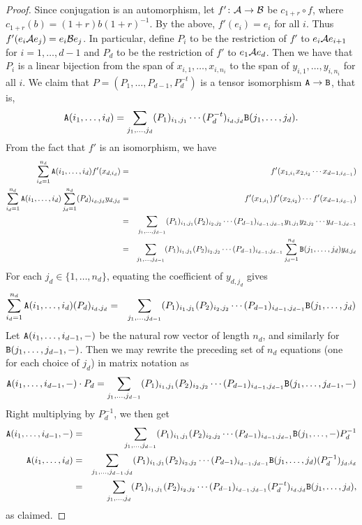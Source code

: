 \documentclass[11pt]{article}
\begin{document}
\begin{proof}
Since conjugation is an automorphism, let $f'\colon \mathcal{A} \to \mathcal{B}$ be $c_{1+r} \circ f$, where $c_{1+r}(b) = (1+r)b(1+r)^{-1}$. By the above, $f'(e_i) = e_i$ for all $i$. 
Thus $f'(e_i \mathcal{A} e_j) = e_i \mathcal{B} e_j$. In particular, define $P_i$ to be the restriction of $f'$ to $e_i \mathcal{A} e_{i+1}$ for $i=1,\dotsc,d-1$ and $P_d$ to be the restriction of $f'$ to $e_1 \mathcal{A} e_d$. Then we have that $P_i$ is a linear bijection from the span of $x_{i,1},\dotsc,x_{i,n_i}$ to the span of $y_{i,1},\dotsc,y_{i,n_i}$ for all $i$. We claim that $P = (P_1,\dotsc,P_{d-1},P_d^{-t})$ is a tensor isomorphism $\mathtt{A} \to \mathtt{B}$, that is, 
\[
\mathtt{A}(i_1, \dotsc, i_d) = \sum_{j_1, \dotsc, j_d} (P_1)_{i_1,j_1} \dotsb (P_d^{-t})_{i_d,j_d} \mathtt{B}(j_1, \dotsc, j_d).
\]
From the fact that $f'$ is an isomorphism, we have
\begin{eqnarray*}
\sum_{i_d=1}^{n_d} \mathtt{A}(i_1, \dotsc, i_d) f'(x_{d,i_d}) & = & f'(x_{1,i_1} x_{2,i_2} \dotsb x_{d-1,i_{d-1}}) \\
\sum_{i_d=1}^{n_d} \mathtt{A}(i_1, \dotsc, i_d) \sum_{j_d=1}^{n_d} (P_d)_{i_d,j_d} y_{d,j_d} & = & f'(x_{1,i_1}) f'(x_{2,i_2}) \dotsb f'(x_{d-1,i_{d-1}}) \\
 & = & \sum_{j_1,\dotsc,j_{d-1}} (P_1)_{i_1,j_1} (P_2)_{i_2,j_2} \dotsb (P_{d-1})_{i_{d-1}, j_{d-1}} y_{1,j_1} y_{2,j_2} \dotsb y_{d-1,j_{d-1}} \\
 & = & \sum_{j_1, \dotsc, j_{d-1}} (P_1)_{i_1,j_1} (P_2)_{i_2,j_2} \dotsb (P_{d-1})_{i_{d-1}, j_{d-1}} \sum_{j_d=1}^{n_d} \mathtt{B}(j_1,\dotsc,j_d) y_{d,j_d}
\end{eqnarray*}
For each $j_d \in \{1,\dotsc,n_d\}$, equating the coefficient of $y_{d,j_d}$ gives
\begin{eqnarray*}
\sum_{i_d=1}^{n_d} \mathtt{A}(i_1, \dotsc, i_d)  (P_d)_{i_d,j_d} & = & \sum_{j_1, \dotsc, j_{d-1}} (P_1)_{i_1,j_1} (P_2)_{i_2,j_2} \dotsb (P_{d-1})_{i_{d-1}, j_{d-1}} \mathtt{B}(j_1,\dotsc,j_d)
\end{eqnarray*}
Let $\mathtt{A}(i_1, \dotsc, i_{d-1}, -)$ be the natural row vector of length $n_d$, and similarly for $\mathtt{B}(j_1, \dotsc, j_{d-1}, -)$. Then we may rewrite the preceding set of $n_d$ equations (one for each choice of $j_d$) in matrix notation as
\[
\mathtt{A}(i_1, \dotsc, i_{d-1}, -) \cdot P_d = \sum_{j_1, \dotsc, j_{d-1}} (P_1)_{i_1,j_1} (P_2)_{i_2,j_2} \dotsb (P_{d-1})_{i_{d-1}, j_{d-1}} \mathtt{B}(j_1,\dotsc, j_{d-1},-)
\]
Right multiplying by $P_d^{-1}$, we then get
\begin{eqnarray*}
\mathtt{A}(i_1, \dotsc, i_{d-1},-) & = & \sum_{j_1, \dotsc, j_{d-1}} (P_1)_{i_1,j_1} (P_2)_{i_2,j_2} \dotsb (P_{d-1})_{i_{d-1}, j_{d-1}} \mathtt{B}(j_1,\dotsc, -) P_d^{-1} \\
\mathtt{A}(i_1,\dotsc,i_d) & = & \sum_{j_1, \dotsc, j_{d-1},j_d} (P_1)_{i_1,j_1} (P_2)_{i_2,j_2} \dotsb (P_{d-1})_{i_{d-1}, j_{d-1}} \mathtt{B}(j_1,\dotsc, j_d) (P_d^{-1})_{j_d,i_d} \\
& = & \sum_{j_1,\dotsc,j_d} (P_1)_{i_1,j_1} (P_2)_{i_2,j_2} \dotsb (P_{d-1})_{i_{d-1}, j_{d-1}} (P_d^{-t})_{i_d,j_d} \mathtt{B}(j_1,\dotsc, j_d),
\end{eqnarray*}
as claimed.
\end{proof}
\end{document}
